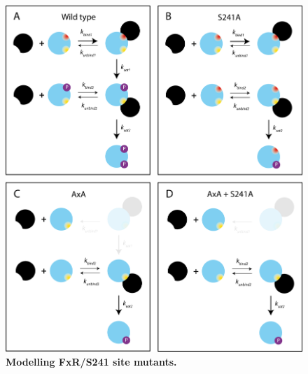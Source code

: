 \documentclass[12pt]{"report"}
\newcommand{\mycaption}[2]{\caption[#1]{\textbf{#1.} #2}}
\begin{document}
\begin{figure}
\includegraphics[scale=0.85]{fxr_mutant_schematic}
\centering
\mycaption{Modelling FxR/S241 site mutants}{}
\label{fig:fxr_mutant_schematic}
\end{figure}
\end{document}
